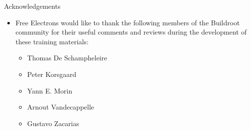 \begin{frame}{Acknowledgements}

  \begin{itemize}

  \item Free Electrons would like to thank the following members of
    the Buildroot community for their useful comments and reviews
    during the development of these training materials:
    \begin{itemize}
    \item Thomas De Schampheleire
    \item Peter Korsgaard
    \item Yann E. Morin
    \item Arnout Vandecappelle
    \item Gustavo Zacarias
    \end{itemize}
  \end{itemize}

\end{frame}